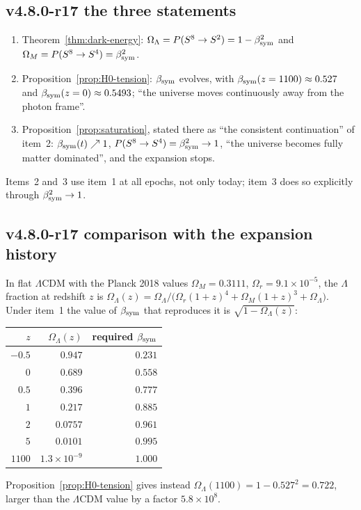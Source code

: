 \subsection*{v4.8.0-r17 the three statements}
\label{subsec:v480-r17-statements}

\begin{enumerate}[leftmargin=2em]
\item Theorem~\ref{thm:dark-energy}: \(\Omega_\Lambda=P(S^8\to S^2)=1-\beta_{\mathrm{sym}}^2\) and
\(\Omega_M=P(S^8\to S^4)=\beta_{\mathrm{sym}}^2\).
\item Proposition~\ref{prop:H0-tension}: \(\beta_{\mathrm{sym}}\) evolves, with \(\beta_{\mathrm{sym}}(z=1100)\approx0.527\) and
\(\beta_{\mathrm{sym}}(z=0)\approx0.5493\); ``the universe moves continuously away from the photon frame''.
\item Proposition~\ref{prop:saturation}, stated there as ``the consistent continuation'' of item~2:
\(\beta_{\mathrm{sym}}(t)\nearrow1\), \(P(S^8\to S^4)=\beta_{\mathrm{sym}}^2\to1\), ``the universe becomes fully matter dominated'', and the
expansion stops.
\end{enumerate}
Items~2 and~3 use item~1 at all epochs, not only today; item~3 does so explicitly through \(\beta_{\mathrm{sym}}^2\to1\).

\subsection*{v4.8.0-r17 comparison with the expansion history}
\label{subsec:v480-r17-comparison}

In flat \(\Lambda\)CDM with the Planck 2018 values \(\Omega_M=0.3111\), \(\Omega_r=9.1\times10^{-5}\), the
\(\Lambda\) fraction at redshift \(z\) is
\(\Omega_\Lambda(z)=\Omega_\Lambda/\bigl(\Omega_r(1+z)^4+\Omega_M(1+z)^3+\Omega_\Lambda\bigr)\).  Under item~1 the
value of \(\beta_{\mathrm{sym}}\) that reproduces it is \(\sqrt{1-\Omega_\Lambda(z)}\):
\begin{center}
\small
\begin{tabular}{@{}rrr@{}}
\toprule
\(z\) & \(\Omega_\Lambda(z)\) & required \(\beta_{\mathrm{sym}}\)\\
\midrule
\(-0.5\) & \(0.947\) & \(0.231\)\\
\(0\) & \(0.689\) & \(0.558\)\\
\(0.5\) & \(0.396\) & \(0.777\)\\
\(1\) & \(0.217\) & \(0.885\)\\
\(2\) & \(0.0757\) & \(0.961\)\\
\(5\) & \(0.0101\) & \(0.995\)\\
\(1100\) & \(1.3\times10^{-9}\) & \(1.000\)\\
\bottomrule
\end{tabular}
\end{center}
Proposition~\ref{prop:H0-tension} gives instead \(\Omega_\Lambda(1100)=1-0.527^2=0.722\), larger than the
\(\Lambda\)CDM value by a factor \(5.8\times10^{8}\).

